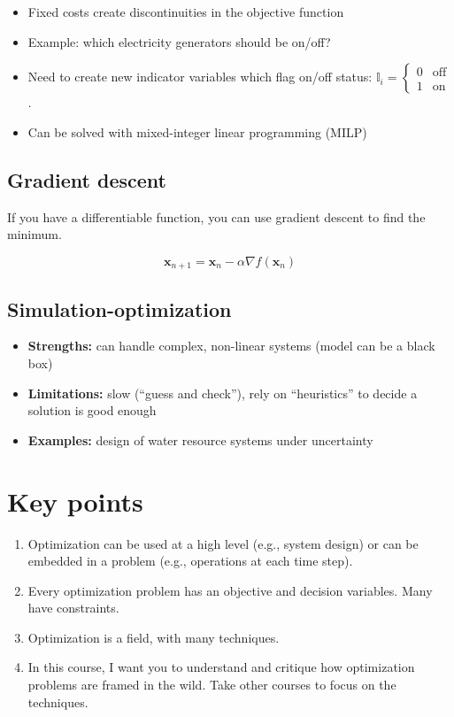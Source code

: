 \documentclass[
  letterpaper,
  DIV=11,
  numbers=noendperiod]{scrreprt}
\providecommand{\tightlist}{%
  \setlength{\itemsep}{0pt}\setlength{\parskip}{0pt}}
\begin{document}
\begin{itemize}
\tightlist
\item
  Fixed costs create discontinuities in the objective function
\item
  Example: which electricity generators should be on/off?
\item
  Need to create new indicator variables which flag on/off status:
  \(\mathbb{I}_i = \begin{cases} 0 & \textrm{off} \\ 1 & \textrm{on} \end{cases}\).
\item
  Can be solved with mixed-integer linear programming (MILP)
\end{itemize}

\subsection{Gradient descent}\label{gradient-descent}

If you have a differentiable function, you can use gradient descent to
find the minimum.

\[
\mathbf{x}_{n+1} = \mathbf{x}_n - \alpha \nabla f(\mathbf{x}_n)
\]

\subsection{Simulation-optimization}\label{simulation-optimization}

\begin{itemize}
\tightlist
\item
  \textbf{Strengths:} can handle complex, non-linear systems (model can
  be a black box)
\item
  \textbf{Limitations:} slow (``guess and check''), rely on
  ``heuristics'' to decide a solution is good enough
\item
  \textbf{Examples:} design of water resource systems under uncertainty
\end{itemize}

\section{Key points}\label{key-points-1}

\begin{enumerate}
\def\labelenumi{\arabic{enumi}.}
\tightlist
\item
  Optimization can be used at a high level (e.g., system design) or can
  be embedded in a problem (e.g., operations at each time step).
\item
  Every optimization problem has an objective and decision variables.
  Many have constraints.
\item
  Optimization is a field, with many techniques.
\item
  In this course, I want you to understand and critique how optimization
  problems are framed in the wild. Take other courses to focus on the
  techniques.
\end{enumerate}
\end{document}
